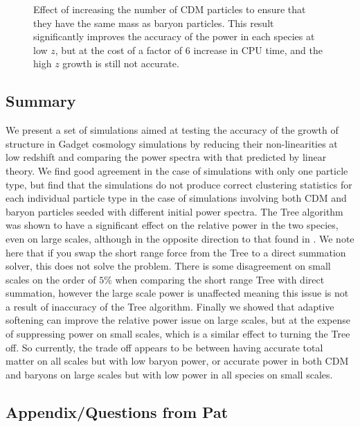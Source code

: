 \documentclass[]{article}
\begin{document}
\begin{figure}[h]
	\caption{Effect of increasing the number of CDM particles to ensure that they have the same mass as baryon particles. This result significantly improves the accuracy of the power in each species at low $z$, but at the cost of a factor of 6 increase in CPU time, and the high $z$ growth is still not accurate.}
\end{figure}

\clearpage
\subsection{Summary}
We present a set of simulations aimed at testing the accuracy of the growth of structure in Gadget cosmology simulations by reducing their non-linearities at low redshift and comparing the power spectra with that predicted by linear theory. We find good agreement in the case of simulations with only one particle type, but find that the simulations do not produce correct clustering statistics for each individual particle type in the case of simulations involving both CDM and baryon particles seeded with different initial power spectra. The Tree algorithm was shown to have a significant effect on the relative power in the two species, even on large scales, although in the opposite direction to that found in \cite{Angulo2013}. We note here that if you swap the short range force from the Tree to a direct summation solver, this does not solve the problem. There is some disagreement on small scales on the order of $5\%$ when comparing the short range Tree with direct summation, however the large scale power is unaffected meaning this issue is not a result of inaccuracy of the Tree algorithm. Finally we showed that adaptive softening can improve the relative power issue on large scales, but at the expense of suppressing power on small scales, which is a similar effect to turning the Tree off. So currently, the trade off appears to be between having accurate total matter on all scales but with low baryon power, or accurate power in both CDM and baryons on large scales but with low power in all species on small scales.

\subsection{Appendix/Questions from Pat}


\end{document}
